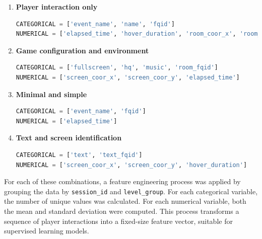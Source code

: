 \documentclass[12pt]{article}
\begin{document}
	\begin{enumerate}
	\item \textbf{Player interaction only}
	\begin{lstlisting}[language=Python, caption=Feature set based on player interaction, basicstyle=\ttfamily\small, breaklines=true]
CATEGORICAL = ['event_name', 'name', 'fqid']
NUMERICAL = ['elapsed_time', 'hover_duration', 'room_coor_x', 'room_coor_y']
	\end{lstlisting}
	
	\item \textbf{Game configuration and environment}
	\begin{lstlisting}[language=Python, caption=Feature set based on configuration and environment, basicstyle=\ttfamily\small, breaklines=true]
CATEGORICAL = ['fullscreen', 'hq', 'music', 'room_fqid']
NUMERICAL = ['screen_coor_x', 'screen_coor_y', 'elapsed_time']
	\end{lstlisting}
	
	\item \textbf{Minimal and simple}
	\begin{lstlisting}[language=Python, caption=Minimal feature set, basicstyle=\ttfamily\small, breaklines=true]
CATEGORICAL = ['event_name', 'fqid']
NUMERICAL = ['elapsed_time']
	\end{lstlisting}
	
	\item \textbf{Text and screen identification}
	\begin{lstlisting}[language=Python, caption=Feature set based on text and interface identifiers, basicstyle=\ttfamily\small, breaklines=true]
CATEGORICAL = ['text', 'text_fqid']
NUMERICAL = ['screen_coor_x', 'screen_coor_y', 'hover_duration']
	\end{lstlisting}
\end{enumerate}

	
	For each of these combinations, a feature engineering process was applied by grouping the data by \texttt{session\_id} and \texttt{level\_group}. For each categorical variable, the number of unique values was calculated. For each numerical variable, both the mean and standard deviation were computed. This process transforms a sequence of player interactions into a fixed-size feature vector, suitable for supervised learning models.
	
\end{document}
